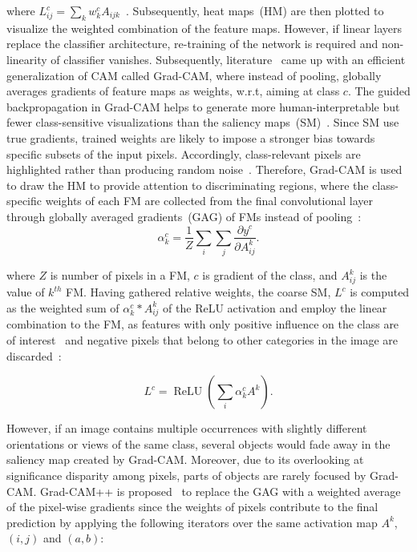 \hspace*{3.5mm} where $L_{i j}^{c}=\sum_{k} w_{k}^{c} A_{i j k}$~\cite{kim2020extending}. Subsequently, heat maps~(HM) are then plotted to visualize the weighted combination of the feature maps. However, if linear layers replace the classifier architecture, re-training of the network is required and non-linearity of classifier vanishes. Subsequently, literature~\cite{114} came up with an efficient generalization of CAM called Grad-CAM, where instead of pooling, globally averages gradients of feature maps as weights, w.r.t, aiming at class $c$. The guided backpropagation in Grad-CAM helps to generate more human-interpretable but fewer class-sensitive visualizations than the saliency maps~(SM)~\cite{nie2018theoretical}. Since SM use true gradients, trained weights are likely to impose a stronger bias towards specific subsets of the input pixels. Accordingly, class-relevant pixels are highlighted rather than producing random noise~\cite{nie2018theoretical}. Therefore, Grad-CAM is used to draw the HM to provide attention to discriminating regions, where the class-specific weights of each FM are collected from the final convolutional layer through globally averaged gradients~(GAG) of FMs instead of pooling~\cite{chattopadhay2018grad}: 
\vspace{-4mm}
\begin{equation}
    \alpha_k^c=\frac{1}{Z}\sum_{i}\sum_{j}\frac{\partial y^c}{\partial A_{ij}^k}.
    \label{eq:alpha}
\end{equation}
\vspace{-4mm}

\hspace*{3.5mm} where $Z$ is number of pixels in a FM, $c$ is gradient of the class, and $A_{ij}^k$ is the value of $k^{th}$ FM. Having gathered relative weights, the coarse SM, $L^c$ is computed as the weighted sum of $\alpha_k^c*A_{ij}^k$ of the ReLU activation and employ the linear combination to the FM, as features with only positive influence on the class are of interest~\cite{chattopadhay2018grad} and negative pixels that belong to other categories in the image are discarded~\cite{114}:

\vspace{-4mm}
\begin{equation}
    L^c=\operatorname{ReLU}(\sum_{i}\alpha_k^cA^k).
    \label{3.11}
\end{equation}
\vspace{-4mm}

\hspace*{3.5mm} However, if an image contains multiple occurrences with slightly different orientations or views of the same class, several objects would fade away in the saliency map created by Grad-CAM. Moreover, due to its overlooking at significance disparity among pixels, parts of objects are rarely focused by Grad-CAM. Grad-CAM++ is proposed~\cite{chattopadhay2018grad} to replace the GAG with a weighted average of the pixel-wise gradients since the weights of pixels contribute to the final prediction by applying the following iterators over the same activation map $A^k$, $(i,j)$ and $(a,b)$:

